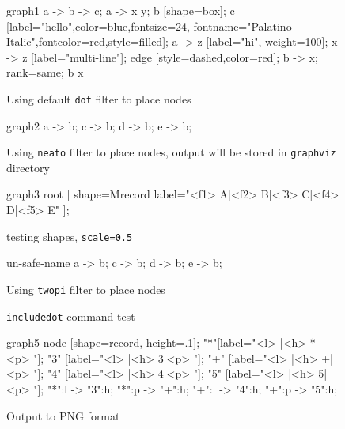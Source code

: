 \documentclass[a4paper,10pt]{article}
\begin{document}
\begin{figure}
  \begin{digraph}{graph1}
               a -> b -> c;
               a -> {x y};
               b [shape=box];
               c [label="hello\nworld",color=blue,fontsize=24,
                    fontname="Palatino-Italic",fontcolor=red,style=filled];
               a -> z [label="hi", weight=100];
               x -> z [label="multi-line\nlabel"];
               edge [style=dashed,color=red];
               b -> x;
               {rank=same; b x}
  \end{digraph}
 \caption{Using default \texttt{dot} filter to place nodes}
\end{figure}

\begin{figure}
  \begin{digraph}[scale=0.5,layout=neato,dir=graphviz]{graph2}
      a -> b;
      c -> b;
      d -> b;
      e -> b;
  \end{digraph}
 \caption{Using \texttt{neato} filter to place nodes, output will be stored in \texttt{graphviz} directory}
\end{figure}

\begin{figure}
  \begin{digraph}[scale=0.6]{graph3}
  root [ shape=Mrecord label="<f1> A|<f2> B|{<f3> C|<f4> D}|<f5> E" ];
  \end{digraph}
  \caption{testing shapes, \texttt{scale=0.5}}
\end{figure}

\begin{figure}
  \begin{digraph}[layout=twopi,scale=0.6]{un-safe-name}
      a -> b;
      c -> b;
      d -> b;
      e -> b;
  \end{digraph}
 \caption{Using \texttt{twopi} filter to place nodes}
\end{figure}

\begin{figure}
 \caption{\texttt{includedot} command test}
\end{figure}

\begin{figure}
  \begin{digraph}[scale=0.5,output=png]{graph5}
      node [shape=record, height=.1];
      "*"[label="<l> |<h> *|<p> "];
      "3" [label="<l> |<h> 3|<p> "];
      "+" [label="<l> |<h> +|<p> "];
      "4" [label="<l> |<h> 4|<p> "];
      "5" [label="<l> |<h> 5|<p> "];
      "*":l -> "3":h;
      "*":p -> "+":h;
      "+":l -> "4":h;
      "+":p -> "5":h;
  \end{digraph}
 \caption{Output to PNG format}
\end{figure}
\end{document}
